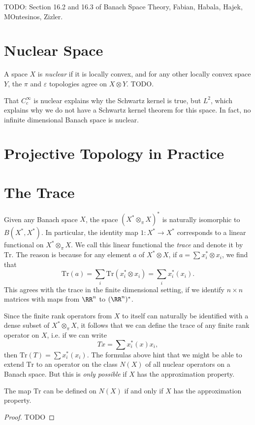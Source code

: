 TODO: Section 16.2 and 16.3 of Banach Space Theory, Fabian, Habala, Hajek, MOntesinos, Zizler.

\section{Nuclear Space}

A space $X$ is \emph{nuclear} if it is locally convex, and for any other locally convex space $Y$, the $\pi$ and $\varepsilon$ topologies agree on $X \otimes Y$. TODO.

That $C_c^\infty$ is nuclear explains why the Schwartz kernel is true, but $L^2$, which explains why we do not have a Schwartz kernel theorem for this space. In fact, no infinite dimensional Banach space is nuclear.

\section{Projective Topology in Practice}



\section{The Trace}

Given any Banach space $X$, the space $(X^* \otimes_\pi X)^*$ is naturally isomorphic to $B(X^*,X^*)$. In particular, the identity map $1: X^* \to X^*$ corresponds to a linear functional on $X^* \otimes_\pi X$. We call this linear functional the \emph{trace} and denote it by $\text{Tr}$. The reason is because for any element $a$ of $X^* \otimes X$, if $a = \sum x_i^* \otimes x_i$, we find that
%
\[ \text{Tr}(a) = \sum_i \text{Tr}(x_i^* \otimes x_i) = \sum_i x_i^*(x_i). \]
%
This agrees with the trace in the finite dimensional setting, if we identify $n \times n$ matrices with maps from $\RR^n$ to $(\RR^n)^*$.

Since the finite rank operators from $X$ to itself can naturally be identified with a dense subset of $X^* \otimes_\pi X$, it follows that we can define the trace of any finite rank operator on $X$, i.e. if we can write
%
\[ Tx = \sum x_i^*(x) x_i, \]
%
then $\text{Tr}(T) = \sum x_i^*(x_i)$. The formulas above hint that we might be able to extend $\text{Tr}$ to an operator on the class $N(X)$ of all nuclear operators on a Banach space. But this is \emph{only possible} if $X$ has the approximation property.

\begin{theorem}
    The map $\text{Tr}$ can be defined on $N(X)$ if and only if $X$ has the approximation property.
\end{theorem}
\begin{proof}
    TODO
\end{proof}

